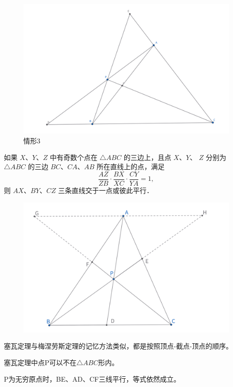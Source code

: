 \begin{figure}[htbp]
\begin{minipage}[t]{0.3\textwidth}
    \end{minipage}
        \hfill %
    \begin{minipage}[t]{0.3\textwidth}
    \centering
    \includegraphics[width=\linewidth]{figures/ceva (1).png}
    \caption{情形3}
    \end{minipage}
\end{figure}


\begin{theorem}
如果 $X 、 Y 、 Z$ 中有奇数个点在 $\triangle A B C$ 的三边上，且点 $X 、 Y 、$ $Z$ 分别为 $\triangle A B C$ 的三边 $B C 、 C A 、 A B$ 所在直线上的点，满足 
$$\frac{A Z}{Z B} \cdot \frac{B X}{X C} \cdot \frac{C Y}{Y A}=1,$$
则 $A X 、 B Y 、 C Z$ 三条直线交于一点或彼此平行．
\end{theorem}


\begin{figure}[htbp]
    \centering
    \includegraphics[width=0.6\linewidth]{figures/ceva辅助线.png}
\end{figure}
\begin{remark}
    塞瓦定理与梅涅劳斯定理的记忆方法类似，都是按照顶点-截点-顶点的顺序。

    塞瓦定理中点P可以不在$\triangle ABC$形内。
    
    P为无穷原点时，BE、AD、CF三线平行，等式依然成立。

    
\end{remark}


